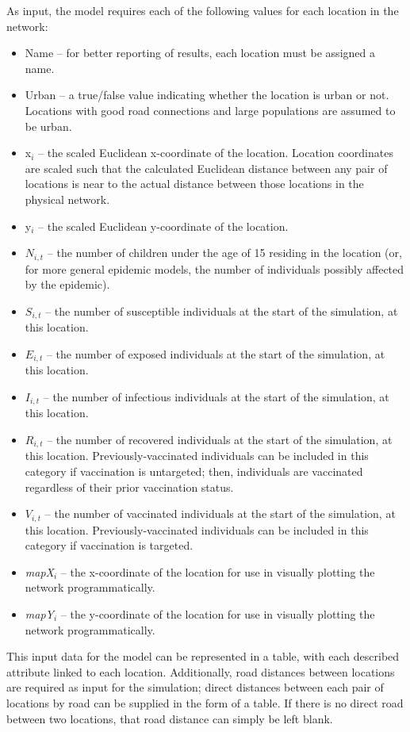 As input, the model requires each of the following values for each location in the network:
\begin{itemize}
    \item Name -- for better reporting of results, each location must be assigned a name.
    \item Urban -- a true/false value indicating whether the location is urban or not. Locations with good road connections and large populations are assumed to be urban.
    \item x$_{i}$ -- the scaled Euclidean x-coordinate of the location. Location coordinates are scaled such that the calculated Euclidean distance between any pair of locations is near to the actual distance between those locations in the physical network.
    \item y$_{i}$ -- the scaled Euclidean y-coordinate of the location.
    \item $N_{i,t}$ -- the number of children under the age of 15 residing in the location (or, for more general epidemic models, the number of individuals possibly affected by the epidemic).
    \item $S_{i,t}$ -- the number of susceptible individuals at the start of the simulation, at this location.
    \item $E_{i,t}$ -- the number of exposed individuals at the start of the simulation, at this location.
    \item $I_{i,t}$ -- the number of infectious individuals at the start of the simulation, at this location.
    \item $R_{i,t}$ -- the number of recovered individuals at the start of the simulation, at this location. Previously-vaccinated individuals can be included in this category if vaccination is untargeted; then, individuals are vaccinated regardless of their prior vaccination status.
    \item $V_{i,t}$ -- the number of vaccinated individuals at the start of the simulation, at this location. Previously-vaccinated individuals can be included in this category if vaccination is targeted.
    \item \textit{mapX}$_{i}$ -- the x-coordinate of the location for use in visually plotting the network programmatically.
    \item \textit{mapY}$_{i}$ -- the y-coordinate of the location for use in visually plotting the network programmatically.
\end{itemize}

This input data for the model can be represented in a table, with each described attribute linked to each location. Additionally, road distances between locations are required as input for the simulation; direct distances between each pair of locations by road can be supplied in the form of a table. If there is no direct road between two locations, that road distance can simply be left blank.


